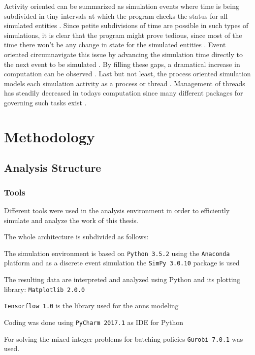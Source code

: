 \documentclass{seal_thesis}
\begin{document}
Activity oriented can be summarized as simulation events where time is being subdivided in tiny intervals at which the program checks the status for all simulated entities \cite{Matloff2008}. Since petite subdivisions of time are possible in such types of simulations, it is clear that the program might prove tedious, since most of the time there won't be any change in state for the simulated entities \cite{Matloff2008}. Event oriented circumnavigate this issue by advancing the simulation time directly to the next event to be simulated \cite{Matloff2008}. By filling these gaps, a dramatical increase in computation can be observed \cite{Matloff2008}. Last but not least, the process oriented simulation models each simulation activity as a process or thread \cite{Matloff2008}. Management of threads has steadily decreased in todays computation since many different packages for governing such tasks exist \cite{Matloff2008}.

\glsresetall

\chapter{Methodology}
\label{ch:methodology}

\section{Analysis Structure}
\subsection{Tools}
Different tools were used in the analysis environment in order to efficiently simulate and analyze the work of this thesis.

The whole architecture is subdivided as follows:
\begin{enumerate*}
	\item The simulation environment is based on \texttt{Python 3.5.2} using the \texttt{Anaconda} platform and as a discrete event simulation the \texttt{SimPy 3.0.10} package is used
	\item The resulting data are interpreted and analyzed using Python and its plotting library: \texttt{Matplotlib 2.0.0}
	\item \texttt{Tensorflow 1.0} is the library used for the \glspl{ann} modeling
	\item Coding was done using \texttt{PyCharm 2017.1} as IDE for Python
	\item For solving the mixed integer problems for batching policies \texttt{Gurobi 7.0.1} was used.
\end{enumerate*}
\end{document}
